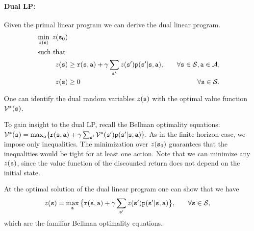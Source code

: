 \paragraph{Dual LP:}
Given the primal linear program we can derive the dual linear
program.
\begin{align*}
\min_{z(\state)}  \;z(\state_0)&\\
\mbox{ such that }\\
%
 z(\state) &\geq
\reward(\state,\action) + \discount
\sum_{\state'}z(\state')\transitionprob(\state'|\state,\action) , &\quad\forall
\state \in {\States},\action\in\Actions, \\ 
 z(\state) &\geq 0  &\quad\forall \state \in {\States}.
\end{align*}

One can identify the dual random variables $z({\tt s})$ with the
optimal value function $\mathcal{V}^*({\tt s})$. 

To gain insight to the dual LP, recall the Bellman optimality equations: 
$\mathcal{V}^*({\tt s}) =
\max_a\{ {\tt r}({\tt s},{\tt a}) + \gamma
\sum_{{\tt s}'}\mathcal{V}^*({\tt s}'){\tt p}({\tt s}'|{\tt s},{\tt a})\}$.
As in the finite horizon case, we impose only inequalities. The minimization over $z({\tt s}_0)$ guarantees that the inequalities would be tight for at least one action. Note that we can minimize any $z({\tt s})$, since the value function of the discounted return does not depend on the initial state.

At the optimal solution of
the dual linear program one can show that we have
\begin{align*}
 z({\tt s}) &= \max_{\tt a} \big\{
{\tt r}({\tt s},{\tt a}) + \gamma
\sum_{{\tt s}'}z({\tt s}'){\tt p}({\tt s}'|{\tt s},{\tt a}) \big\} ,
&\quad\forall {\tt s} \in {\mathcal{S}},
\end{align*}
which are the familiar Bellman optimality equations.

